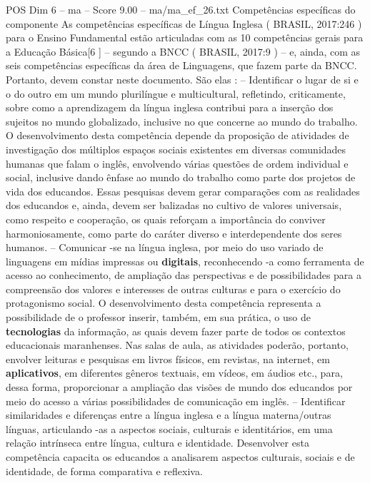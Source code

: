 \begin{textsample}{POS Dim 6 – ma – Score 9.00 – ma/ma\_ef\_26.txt}  \label{ex:f6_pos_096}
Competências específicas do componente As competências específicas de Língua Inglesa ( BRASIL, 2017:246 ) para o Ensino Fundamental estão articuladas com as 10 competências gerais para a Educação Básica[6 ] – segundo a BNCC ( BRASIL, 2017:9 ) – e, ainda, com as seis competências específicas da área de Linguagens, que fazem parte da BNCC.
Portanto, devem constar neste documento.
São elas : – Identificar o lugar de si e o do outro em um mundo plurilíngue e multicultural, refletindo, criticamente, sobre como a aprendizagem da língua inglesa contribui para a inserção dos sujeitos no mundo globalizado, inclusive no que concerne ao mundo do trabalho.
O desenvolvimento desta competência depende da proposição de atividades de investigação dos múltiplos espaços sociais existentes em diversas comunidades humanas que falam o inglês, envolvendo várias questões de ordem individual e social, inclusive dando ênfase ao mundo do trabalho como parte dos projetos de vida dos educandos.
Essas pesquisas devem gerar comparações com as realidades dos educandos e, ainda, devem ser balizadas no cultivo de valores universais, como respeito e cooperação, os quais reforçam a importância do conviver harmoniosamente, como parte do caráter diverso e interdependente dos seres humanos. – Comunicar -se na língua inglesa, por meio do uso variado de linguagens em mídias impressas ou \textbf{digitais}, reconhecendo -a como ferramenta de acesso ao conhecimento, de ampliação das perspectivas e de possibilidades para a compreensão dos valores e interesses de outras culturas e para o exercício do protagonismo social.
O desenvolvimento desta competência representa a possibilidade de o professor inserir, também, em sua prática, o uso de \textbf{tecnologias} da informação, as quais devem fazer parte de todos os contextos educacionais maranhenses.
Nas salas de aula, as atividades poderão, portanto, envolver leituras e pesquisas em livros físicos, em revistas, na internet, em \textbf{aplicativos}, em diferentes gêneros textuais, em vídeos, em áudios etc., para, dessa forma, proporcionar a ampliação das visões de mundo dos educandos por meio do acesso a várias possibilidades de comunicação em inglês. – Identificar similaridades e diferenças entre a língua inglesa e a língua materna/outras línguas, articulando -as a aspectos sociais, culturais e identitários, em uma relação intrínseca entre língua, cultura e identidade.
Desenvolver esta competência capacita os educandos a analisarem aspectos culturais, sociais e de identidade, de forma comparativa e reflexiva.

\end{textsample}
